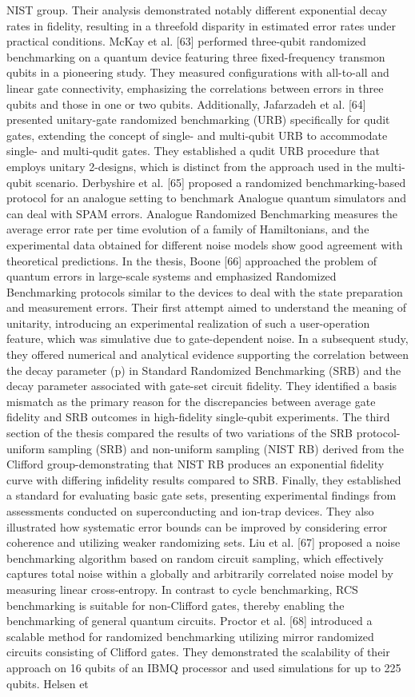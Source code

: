 NIST group. Their analysis demonstrated notably different exponential decay rates in fidelity, resulting in a threefold disparity in estimated error rates under practical conditions. McKay et al. [63] performed three-qubit randomized benchmarking on a quantum device featuring three fixed-frequency transmon qubits in a pioneering study. They measured configurations with all-to-all and linear gate connectivity, emphasizing the correlations between errors in three qubits and those in one or two qubits. Additionally, Jafarzadeh et al. [64] presented unitary-gate randomized benchmarking (URB) specifically for qudit gates, extending the concept of single- and multi-qubit URB to accommodate single- and multi-qudit gates. They established a qudit URB procedure that employs unitary 2-designs, which is distinct from the approach used in the multi-qubit scenario. Derbyshire et al. [65] proposed a randomized benchmarking-based protocol for an analogue setting to benchmark Analogue quantum simulators and can deal with SPAM errors. Analogue Randomized Benchmarking measures the average error rate per time evolution of a family of Hamiltonians, and the experimental data obtained for different noise models show good agreement with theoretical predictions. In the thesis, Boone [66] approached the problem of quantum errors in large-scale systems and emphasized Randomized Benchmarking protocols similar to the devices to deal with the state preparation and measurement errors. Their first attempt aimed to understand the meaning of unitarity, introducing an experimental realization of such a user-operation feature, which was simulative due to gate-dependent noise. In a subsequent study, they offered numerical and analytical evidence supporting the correlation between the decay parameter (p) in Standard Randomized Benchmarking (SRB) and the decay parameter associated with gate-set circuit fidelity. They identified a basis mismatch as the primary reason for the discrepancies between average gate fidelity and SRB outcomes in high-fidelity single-qubit experiments. The third section of the thesis compared the results of two variations of the SRB protocol-uniform sampling (SRB) and non-uniform sampling (NIST RB) derived from the Clifford group-demonstrating that NIST RB produces an exponential fidelity curve with differing infidelity results compared to SRB. Finally, they established a standard for evaluating basic gate sets, presenting experimental findings from assessments conducted on superconducting and ion-trap devices. They also illustrated how systematic error bounds can be improved by considering error coherence and utilizing weaker randomizing sets. Liu et al. [67] proposed a noise benchmarking algorithm based on random circuit sampling, which effectively captures total noise within a globally and arbitrarily correlated noise model by measuring linear cross-entropy. In contrast to cycle benchmarking, RCS benchmarking is suitable for non-Clifford gates, thereby enabling the benchmarking of general quantum circuits. Proctor et al. [68] introduced a scalable method for randomized benchmarking utilizing mirror randomized circuits consisting of Clifford gates. They demonstrated the scalability of their approach on 16 qubits of an IBMQ processor and used simulations for up to 225 qubits. Helsen et 